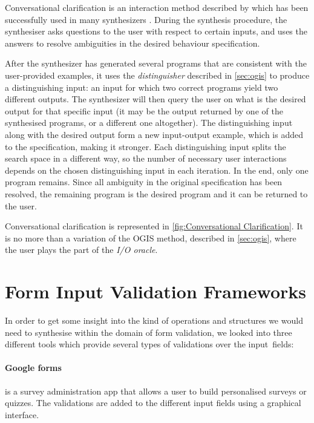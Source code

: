 
Conversational clarification is an interaction method described by \citeauthor{DBLP:conf/uist/MayerSGLMPSZG15} \cite{DBLP:conf/uist/MayerSGLMPSZG15} which has been successfully used in many synthesizers  \cite{DBLP:journals/pvldb/LiCM15,DBLP:journals/corr/abs-19,DBLP:conf/sigmod/WangCB17,DBLP:conf/pldi/WangCB17}.
During the synthesis procedure, the synthesiser asks questions to the user with respect to certain inputs, and uses the answers to resolve ambiguities in the desired behaviour specification. 

After the synthesizer has generated several programs that are consistent with the user-provided examples, it uses the \textit{distinguisher} described in \autoref{sec:ogis} to produce a distinguishing input: an input for which two correct programs yield two different outputs. The synthesizer will then query the user on what is the desired output for that specific input (it may be the output returned by one of the synthesised programs, or a different one altogether). The distinguishing input along with the desired output form a new input-output example, which is added to the specification, making it stronger. Each distinguishing input splits the search space in a different way, so the number of necessary user interactions depends on the chosen distinguishing input in each iteration. In the end, only one program remains. Since all ambiguity in the original specification has been resolved, the remaining program is the desired program and it can be returned to the user.

Conversational clarification is represented in \autoref{fig:Conversational Clarification}. It is no more than a variation of the \ac{OGIS} method, described in \autoref{sec:ogis}, where the user plays the part of the \textit{I/O oracle}.

\section{Form Input Validation Frameworks} \label{sec:form-validation}

In order to get some insight into the kind of operations and structures we would need to synthesise within the domain of form validation, we looked into three different tools which provide several types of validations over the input~fields:

\paragraph{Google forms\protect\footnotemark} is a survey administration app that allows a user to build personalised surveys or quizzes. The validations are added to the different input fields using a graphical interface. 

